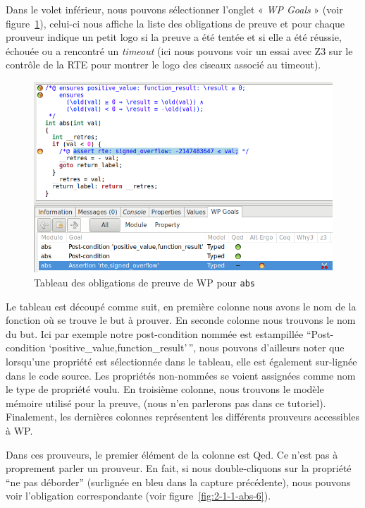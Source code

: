 \documentclass[12pt,francais,]{scrbook}
\begin{document}
Dans le volet inférieur, nous pouvons sélectionner l'onglet « \emph{WP
  Goals} » (voir figure~\ref{fig:2-1-1-abs-5}), celui-ci nous affiche la
liste des obligations de preuve et
pour chaque prouveur indique un petit logo si la preuve a été tentée et
si elle a été réussie, échouée ou a rencontré un \emph{timeout} (ici
nous pouvons voir un essai avec Z3 sur le contrôle de la RTE pour
montrer le logo des ciseaux associé au timeout).

\begin{figure}[htbp]
\centering
\includegraphics[scale=0.5]{2-1-1-abs-5.png}
\caption{Tableau des obligations de preuve de WP pour \texttt{abs}}
\label{fig:2-1-1-abs-5}
\end{figure}

Le tableau est découpé comme suit, en première colonne nous avons le nom
de la fonction où se trouve le but à prouver. En seconde colonne nous
trouvons le nom du but. Ici par exemple notre post-condition nommée est
estampillée ``Post-condition `positive\_value,function\_result'\,'',
nous pouvons d'ailleurs noter que lorsqu'une propriété est sélectionnée
dans le tableau, elle est également sur-lignée dans le code source. Les
propriétés non-nommées se voient assignées comme nom le type de
propriété voulu. En troisième colonne, nous trouvons le modèle mémoire
utilisé pour la preuve, (nous n'en parlerons pas dans ce tutoriel).
Finalement, les dernières colonnes représentent les différents prouveurs
accessibles à WP.

Dans ces prouveurs, le premier élément de la colonne est Qed. Ce n'est
pas à proprement parler un prouveur. En fait, si nous double-cliquons
sur la propriété ``ne pas déborder'' (surlignée en bleu dans la capture
précédente), nous pouvons voir l'obligation correspondante (voir
figure~\ref{fig:2-1-1-abs-6}).
\end{document}

